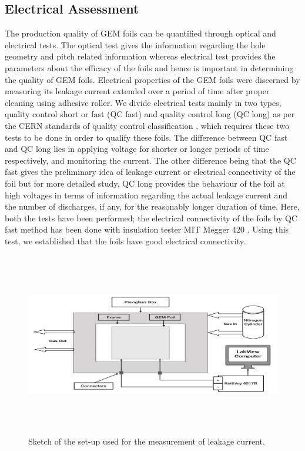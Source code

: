 \subsection{Electrical Assessment}
The production quality of GEM foils can be quantified through optical and electrical tests. The optical test gives the information regarding the hole geometry and pitch related information whereas electrical test provides the parameters about the efficacy of the foils and hence is important in determining the quality of GEM foils. Electrical properties of the GEM foils were discerned by measuring its leakage current extended over a period of time after proper cleaning using adhesive roller. We divide electrical tests mainly in two types, quality control short or fast (QC fast) and quality control long (QC long) as per the CERN standards of quality control classification \cite{eleven}, which requires these two tests to be done in order to qualify these foils. The difference between QC fast and QC long lies in applying voltage for shorter or longer periods of time respectively, and monitoring the current. The other difference being that the QC fast gives the preliminary idea of leakage current or electrical connectivity of the foil but for more detailed study, QC long provides the behaviour of the foil at high voltages in terms of information regarding the actual leakage current and the number of discharges, if any, for the reasonably longer duration of time. Here, both the tests have been performed; the electrical connectivity of the foils by QC fast method has been done with insulation tester MIT Megger 420 \cite{twelve}. Using this test, we established that the foils have good electrical connectivity.
\begin{figure}[!ht]
    \centering
        \includegraphics[width=12cm,height=8cm]{figures/GEM/figures/10.jpeg}
   \caption{Sketch of the set-up used for the measurement of leakage current.} \label{fig:Cleaning_Measurement}
\end{figure}
